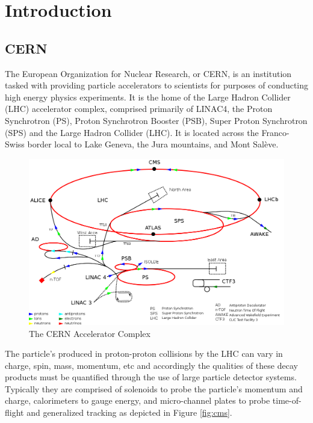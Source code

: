 \chapter{Introduction}

\section{CERN}

The European Organization for Nuclear Research, or CERN, is an institution tasked with providing particle accelerators to scientists for purposes of conducting high energy physics experiments. It is the home of the Large Hadron Collider (LHC) accelerator complex, comprised primarily of LINAC4, the Proton Synchrotron (PS), Proton Synchrotron Booster (PSB), Super Proton Synchrotron (SPS) and the Large Hadron Collider (LHC). It is located across the Franco-Swiss border local to Lake Geneva, the Jura mountains, and Mont Salève.

\begin{figure}
    \centering
    \includegraphics{figs/1024px-Cern-accelerator-complex.svg.png}
    \caption{The CERN Accelerator Complex}
    \label{fig:cern}
\end{figure}

The particle's produced in proton-proton collisions by the LHC can vary in charge, spin, mass, momentum, etc and accordingly the qualities of these decay products must be quantified through the use of large particle detector systems. Typically they are comprised of solenoids to probe the particle's momentum and charge, calorimeters to gauge energy, and micro-channel plates to probe time-of-flight and generalized tracking as depicted in Figure \ref{fig:cms}.


